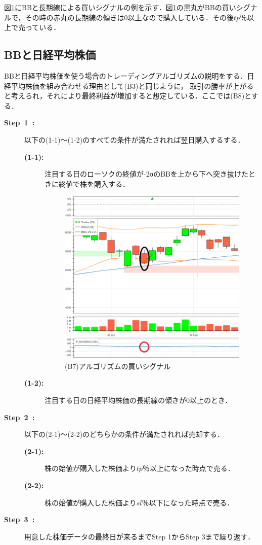    図\ref{fig:bbfma}にBBと長期線による買いシグナルの例を示す．図\ref{fig:bbfma}の黒丸がBBの買いシグナルで，その時の赤丸の長期線の傾きは0以上なので購入している．その後$tp$％以上で売っている．
\subsection{BBと日経平均株価}
BBと日経平均株価を使う場合のトレーディングアルゴリズムの説明をする．日経平均株価を組み合わせる理由として(B3)と同じように，
取引の勝率が上がると考えられ，それにより最終利益が増加すると想定している．ここでは(B8)とする．
\begin{description}
  \item[\textbf{Step~1~:}]以下の(1-1)～(1-2)のすべての条件が満たされれば翌日購入するする．
  \begin{description}
    \item[\textbf{(1-1):}]注目する日のローソクの終値が-2σのBBを上から下へ突き抜けたときに終値で株を購入する．
    \begin{figure}[t]
      \centering
      \includegraphics[width=110mm]{fig/bb_fma_paint.png}
      \caption{(B7)アルゴリズムの買いシグナル}
      \label{fig:bbfma}
     \end{figure}
    \item[\textbf{(1-2):}]注目する日の日経平均株価の長期線の傾きが0以上のとき．
   \end{description}  
  
  \item[\textbf{Step~2~:}]以下の(2-1)～(2-2)のどちらかの条件が満たされれば売却する．
   \begin{description}
    \item[\textbf{(2-1):}]株の始値が購入した株価より$tp$％以上になった時点で売る．
    \item[\textbf{(2-2):}]株の始値が購入した株価より$sl$％以下になった時点で売る． 
   \end{description}
  \item[\textbf{Step~3~:}]用意した株価データの最終日が来るまでStep 1からStep 3まで繰り返す．
  \end{description}
  
